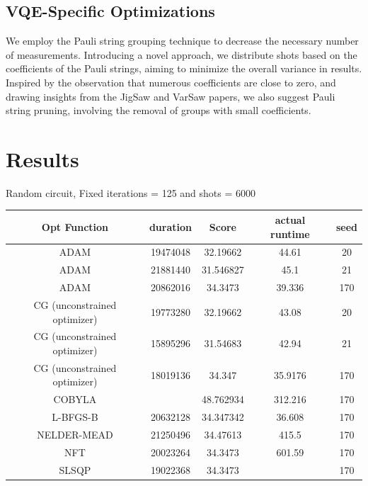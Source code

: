 \documentclass{article}
\begin{document}
\subsection{VQE-Specific Optimizations}
We employ the Pauli string grouping technique to decrease the necessary number of measurements. Introducing a novel approach, we distribute shots based on the coefficients of the Pauli strings, aiming to minimize the overall variance in results. Inspired by the observation that numerous coefficients are close to zero, and drawing insights from the JigSaw and VarSaw papers, we also suggest Pauli string pruning, involving the removal of groups with small coefficients.

\section{Results}

Random circuit, Fixed iterations = 125 and shots = 6000
\begin{center}
\scriptsize
\begin{tabular}{||c c c c c||} 
 \hline
 Opt Function & duration  & Score & actual runtime & seed \\ [0.5ex] 
 \hline\hline
ADAM & 19474048  & 32.19662 & 44.61 & 20\\
ADAM & 21881440  & 31.546827 & 45.1 & 21\\
ADAM & 20862016  & 34.3473 & 39.336 & 170\\
CG (unconstrained optimizer) & 19773280  & 32.19662 & 43.08 & 20\\
CG (unconstrained optimizer) & 15895296  & 31.54683 & 42.94 & 21\\
CG (unconstrained optimizer) & 18019136  & 34.347 & 35.9176 & 170\\
COBYLA &   & 48.762934 & 312.216 & 170\\
L-BFGS-B  & 20632128 & 34.347342 & 36.608 & 170\\
NELDER-MEAD & 21250496 & 34.47613 & 415.5 & 170\\
NFT & 20023264  & 34.3473 & 601.59 & 170\\
SLSQP & 19022368 & 34.3473 & & 170 \\[1ex] 
 \hline

\end{tabular}
\end{center}
\end{document}
